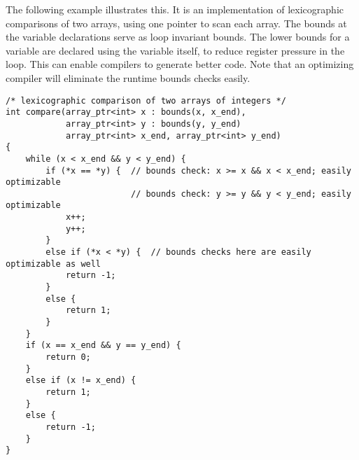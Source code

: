 The following example illustrates this. It is an implementation of
lexicographic comparisons of two arrays, using one pointer to scan each
array. The bounds at the variable declarations serve as loop invariant
bounds. The lower bounds for a variable are declared using the variable
itself, to reduce register pressure in the loop. This can enable
compilers to generate better code. Note that an optimizing compiler will
eliminate the runtime bounds checks easily.

\begin{verbatim}
/* lexicographic comparison of two arrays of integers */
int compare(array_ptr<int> x : bounds(x, x_end), 
            array_ptr<int> y : bounds(y, y_end)
            array_ptr<int> x_end, array_ptr<int> y_end)
{ 
    while (x < x_end && y < y_end) {
        if (*x == *y) {  // bounds check: x >= x && x < x_end; easily optimizable
                         // bounds check: y >= y && y < y_end; easily optimizable
            x++;
            y++;
        }
        else if (*x < *y) {  // bounds checks here are easily optimizable as well
            return -1;
        }
        else {
            return 1;
        }
    }
    if (x == x_end && y == y_end) {
        return 0;
    }
    else if (x != x_end) {
        return 1;
    }
    else {
        return -1; 
    }
}
\end{verbatim}

